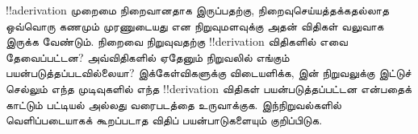 \documentclass[../../../include/open-logic-section]{subfiles}
\begin{document}
\begin{prob}
!!a{derivation} முறைமை நிறைவானதாக இருப்பதற்கு, நிறைவுசெய்யத்தக்கதல்லாத
ஒவ்வொரு கணமும் முரணுடையது என நிறுவுமளவுக்கு அதன் விதிகள் வலுவாக இருக்க
வேண்டும். நிறைவை நிறுவுவதற்கு !!{derivation} விதிகளில் எவை தேவைப்பட்டன?
அவ்விதிகளில் ஏதேனும் நிறுவலில் எங்கும் பயன்படுத்தப்படவில்லையா? இக்கேள்விகளுக்கு
விடையளிக்க,  இன் நிறுவலுக்கு இட்டுச்
செல்லும் எந்த முடிவுகளில் எந்த !!{derivation} விதிகள் பயன்படுத்தப்பட்டன
என்பதைக் காட்டும் பட்டியல் அல்லது வரைபடத்தை உருவாக்குக. இந்நிறுவல்களில்
வெளிப்படையாகக் கூறப்படாத விதிப் பயன்பாடுகளையும் குறிப்பிடுக.
\end{prob}
\tagendprob
\end{document}
